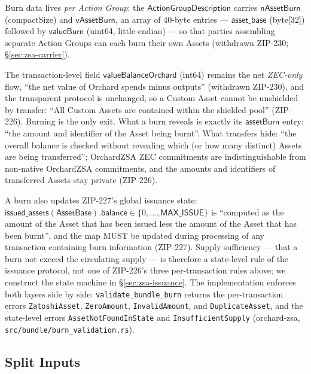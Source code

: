 \documentclass[11pt,a4paper]{article}
\theoremstyle{definition}
\begin{document}
Burn data lives \emph{per Action Group}: the
$\mathsf{ActionGroupDescription}$ carries $\mathsf{nAssetBurn}$
(compactSize) and $\mathsf{vAssetBurn}$, an array of $40$-byte entries ---
$\mathsf{asset\_base}$ (byte[32]) followed by $\mathsf{valueBurn}$ (uint64,
little-endian) --- so that parties assembling separate Action Groups can
each burn their own Assets (withdrawn ZIP-230; \S\ref{sec:zsa-carrier}).

The transaction-level field $\mathsf{valueBalanceOrchard}$ (int64) remains
the net \emph{ZEC-only} flow, ``the net value of Orchard spends minus
outputs'' (withdrawn ZIP-230), and the transparent protocol is unchanged, so
a Custom Asset cannot be unshielded by transfer: ``All Custom Assets are
contained within the shielded pool'' (ZIP-226). Burning is the only exit.
What a burn reveals is exactly its $\mathsf{assetBurn}$ entry: ``the amount
and identifier of the Asset being burnt''. What transfers hide: ``the
overall balance is checked without revealing which (or how many distinct)
Assets are being transferred''; OrchardZSA ZEC commitments are
indistinguishable from non-native OrchardZSA commitments, and the amounts
and identifiers of transferred Assets stay private (ZIP-226).

A burn also updates ZIP-227's global issuance state:
$\mathsf{issued\_assets}(\mathsf{AssetBase}).\mathsf{balance} \in \{0,
\dots, \mathsf{MAX\_ISSUE}\}$ is ``computed as the amount of the Asset that has
been issued less the amount of the Asset that has been burnt'', and the map
MUST be updated during processing of any transaction containing burn
information (ZIP-227). Supply sufficiency --- that a burn not exceed the
circulating supply --- is therefore a state-level rule of the issuance
protocol, not one of ZIP-226's three per-transaction rules above; we
construct the state machine in \S\ref{sec:zsa-issuance}. The implementation
enforces both layers side by side: \texttt{validate\_bundle\_burn} returns
the per-transaction errors \texttt{ZatoshiAsset}, \texttt{ZeroAmount},
\texttt{InvalidAmount}, and \texttt{DuplicateAsset}, and the state-level
errors \texttt{AssetNotFoundInState} and \texttt{InsufficientSupply}
(\textsf{orchard-zsa}, \texttt{src/bundle/burn\_validation.rs}).

\subsection{Split Inputs}\label{sec:zsa-split-inputs}
\end{document}
